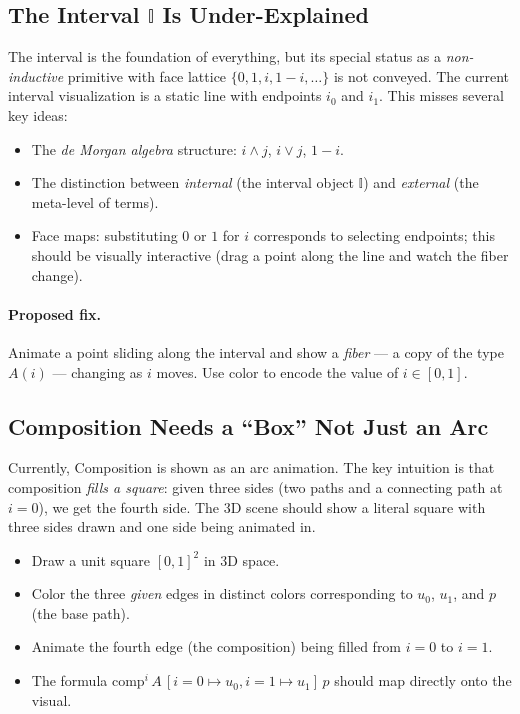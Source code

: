 \documentclass[11pt, a4paper]{article}
\begin{document}
\subsection{The Interval $\mathbb{I}$ Is Under-Explained}

The interval is the foundation of everything, but its special status as a
\emph{non-inductive} primitive with face lattice $\{0, 1, i, 1-i, \ldots\}$ is not
conveyed. The current interval visualization is a static line with endpoints $i_0$
and $i_1$. This misses several key ideas:

\begin{itemize}
  \item The \emph{de Morgan algebra} structure: $i \land j$, $i \lor j$, $1-i$.
  \item The distinction between \emph{internal} (the interval object $\mathbb{I}$)
    and \emph{external} (the meta-level of terms).
  \item Face maps: substituting $0$ or $1$ for $i$ corresponds to selecting
    endpoints; this should be visually interactive (drag a point along the line and
    watch the fiber change).
\end{itemize}

\paragraph{Proposed fix.} Animate a point sliding along the interval and show a
\emph{fiber} — a copy of the type $A(i)$ — changing as $i$ moves. Use color to
encode the value of $i \in [0,1]$.

\subsection{Composition Needs a ``Box'' Not Just an Arc}

Currently, Composition is shown as an arc animation. The key intuition is that
composition \emph{fills a square}: given three sides (two paths and a connecting
path at $i=0$), we get the fourth side. The 3D scene should show a literal square
with three sides drawn and one side being animated in.

\begin{itemize}
  \item Draw a unit square $[0,1]^2$ in 3D space.
  \item Color the three \emph{given} edges in distinct colors corresponding to
    $u_0$, $u_1$, and $p$ (the base path).
  \item Animate the fourth edge (the composition) being filled from $i=0$ to $i=1$.
  \item The formula $\mathrm{comp}^i\,A\,[i=0 \mapsto u_0, i=1 \mapsto u_1]\,p$
    should map directly onto the visual.
\end{itemize}
\end{document}
